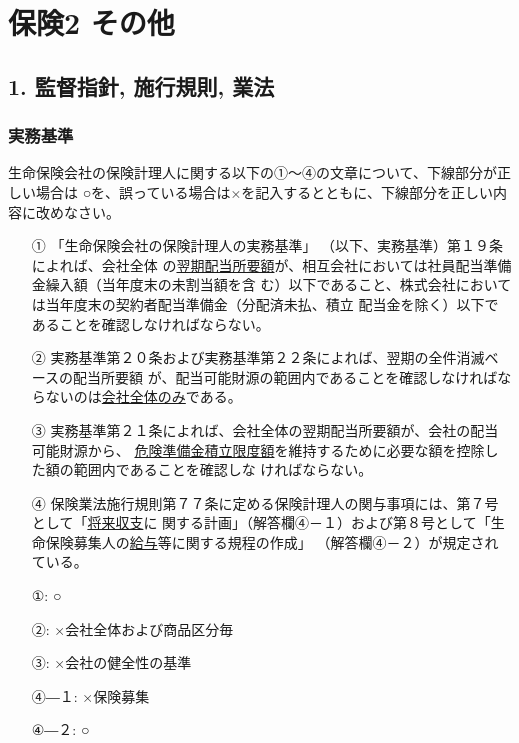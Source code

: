 \documentclass[report,gutter=10mm,fore-edge=10mm,uplatex,dvipdfmx]{jlreq}
\begin{document}
\chapter{保険2 その他}
\section{1. 監督指針, 施行規則, 業法}

\subsection{実務基準}

生命保険会社の保険計理人に関する以下の①～④の文章について、下線部分が正しい場合は
○を、誤っている場合は×を記入するとともに、下線部分を正しい内容に改めなさい。

\begin{itemize}
\item[①] 「生命保険会社の保険計理人の実務基準」
（以下、実務基準）第１９条によれば、会社全体
の\underline{翌期配当所要額}が、相互会社においては社員配当準備金繰入額（当年度末の未割当額を含
む）以下であること、株式会社においては当年度末の契約者配当準備金（分配済未払、積立
配当金を除く）以下であることを確認しなければならない。
\item[②] 実務基準第２０条および実務基準第２２条によれば、翌期の全件消滅ベースの配当所要額
が、配当可能財源の範囲内であることを確認しなければならないのは\underline{会社全体のみ}である。
\item[③] 実務基準第２１条によれば、会社全体の翌期配当所要額が、会社の配当可能財源から、
\underline{危険準備金積立限度額}を維持するために必要な額を控除した額の範囲内であることを確認しな
ければならない。
\item[④] 保険業法施行規則第７７条に定める保険計理人の関与事項には、第７号として「\underline{将来収支}に
関する計画」（解答欄④－１）および第８号として「生命保険募集人の\underline{給与}等に関する規程の作成」
（解答欄④－２）が規定されている。
\end{itemize}
 
\answer{}
\begin{itemize}
\item[ ①: ] ○
\item[ ②: ] ×会社全体および商品区分毎
\item[ ③: ] ×会社の健全性の基準
\item[ ④―１: ] ×保険募集
\item[ ④―２: ] ○
\end{itemize}
\end{document}
